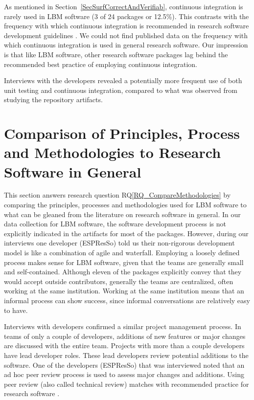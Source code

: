 \documentclass[final, 3p, times, authoryear]{elsarticle}
\newcommand{\rqref}[1]{RQ\ref{#1}}
\begin{document}
As mentioned in Section~\ref{SecSurfCorrectAndVerifiab}, continuous integration
is rarely used in LBM software (3 of 24 packages or 12.5\%). This contrasts with
the frequency with which continuous integration is recommended in research
software development guidelines \citep{BrettEtAl2021, Brown2015, ThielEtAl2020,
Zadka2018, vanGompelEtAl2016}.  We could not find published data on the
frequency with which continuous integration is used in general research
software.  Our impression is that like LBM software, other research software
packages lag behind the recommended best practice of employing continuous
integration.

Interviews with the developers revealed a potentially more frequent use of both
unit testing and continuous integration, compared to what was observed from
studying the repository artifacts.

\section{Comparison of Principles, Process and Methodologies to Research Software in General} \label{Sec_CompareMethodologies}

This section answers research question \rqref{RQ_CompareMethodologies} by
comparing the principles, processes and methodologies used for LBM software to
what can be gleaned from the literature on research software in general. In our
data collection for LBM software, the software development process is not
explicitly indicated in the artifacts for most of the packages. However, during
our interviews one developer (ESPResSo) told us their non-rigorous development
model is like a combination of agile and waterfall. Employing a loosely defined
process makes sense for LBM software, given that the teams are generally small
and self-contained.  Although eleven of the packages explicitly convey that they
would accept outside contributors, generally the teams are centralized, often
working at the same institution.  Working at the same institution means that an
informal process can show success, since informal conversations are relatively
easy to have.

Interviews with developers confirmed a similar project management process. In
teams of only a couple of developers, additions of new features or major changes
are discussed with the entire team. Projects with more than a couple developers
have lead developer roles. These lead developers review potential additions to
the software. One of the developers (ESPResSo) that was interviewed noted that
an ad hoc peer review process is used to assess major changes and additions.
Using peer review (also called technical review) matches with recommended
practice for research software \citep{HerouxEtAl2008, Givler2020, OrvizEtAl2017,
USGS2019}.
\end{document}
